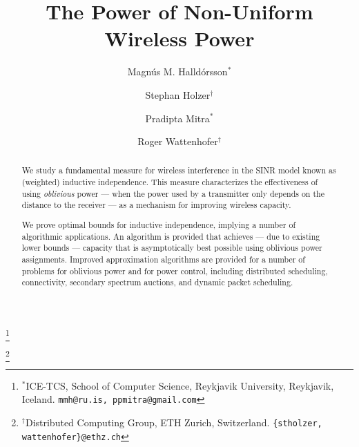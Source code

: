 \documentclass[11pt]{amsart}
\begin{document}
\title{\Large The Power of Non-Uniform Wireless Power}







\author{Magn\'us M. Halld\'orsson$^\ast$}
\thanks{$^\ast$ICE-TCS, School of Computer Science,
    Reykjavik University, Reykjavik, Iceland. 
    \texttt{mmh@ru.is, ppmitra@gmail.com}}
\author{Stephan Holzer$^\dag$}
\thanks{$^\dag$Distributed Computing Group, ETH Zurich, Switzerland. \texttt{\{stholzer, wattenhofer\}@ethz.ch}}
\author{Pradipta Mitra$^\ast$} 

\author{Roger Wattenhofer$^\dag$}

\date{}



\begin{abstract}
We study a fundamental measure for wireless interference in the SINR model
known as (weighted) inductive independence.
This measure characterizes the effectiveness of using \emph{oblivious} power --- when 
the power used by a transmitter only depends on the distance to the receiver  --- as
a mechanism for improving wireless capacity. 

We prove optimal bounds for inductive independence, implying a number of algorithmic
applications. An algorithm is provided that achieves --- due to existing lower bounds --- capacity that is asymptotically best possible using oblivious power assignments. Improved
approximation algorithms are provided for a number of problems for oblivious
power and for power control, including distributed scheduling, connectivity, secondary
spectrum auctions, and dynamic packet scheduling.
\end{abstract}

\iffalse
\begin{abstract}
We study a  fundamental measure for wireless interference in the SINR model.
This measure characterizes the effectiveness of using \emph{oblivious} power --- when 
the power used by a transmitter only depends on the distance to the receiver  --- as
a mechanism for improving wireless capacity. 

We prove optimal bounds for this measure, implying a number of algorithmic
applications. An algorithm is provided that achieves---due to existing lower bounds---a capacity that is asymptotically best possible using oblivious power assignments. Improved
approximation algorithms are provided for a number of problems for oblivious
power and for power control --- including distributed scheduling, secondary
spectrum auctions, wireless connectivity, and dynamic packet scheduling.
\end{abstract}
\fi
\end{document}
